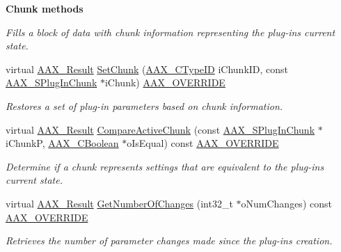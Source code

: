 \begin{Indent}{\bf Chunk methods}
\begin{DoxyCompactItemize}
\begin{DoxyCompactList}\small\item\em Fills a block of data with chunk information representing the plug-\/in\textquotesingle{}s current state. \end{DoxyCompactList}\item 
virtual \hyperlink{a00149_a4d8f69a697df7f70c3a8e9b8ee130d2f}{A\+A\+X\+\_\+\+Result} \hyperlink{a00018_af80a63ce88a2e95afb77aaca71dcb73f}{Set\+Chunk} (\hyperlink{a00149_ac678f9c1fbcc26315d209f71a147a175}{A\+A\+X\+\_\+\+C\+Type\+I\+D} i\+Chunk\+I\+D, const \hyperlink{a00125}{A\+A\+X\+\_\+\+S\+Plug\+In\+Chunk} $\ast$i\+Chunk) \hyperlink{a00149_ac2f24a5172689ae684344abdcce55463}{A\+A\+X\+\_\+\+O\+V\+E\+R\+R\+I\+D\+E}
\begin{DoxyCompactList}\small\item\em Restores a set of plug-\/in parameters based on chunk information. \end{DoxyCompactList}\item 
virtual \hyperlink{a00149_a4d8f69a697df7f70c3a8e9b8ee130d2f}{A\+A\+X\+\_\+\+Result} \hyperlink{a00018_af9d1e4ffec9dabf9fe8e71f89d3d18b2}{Compare\+Active\+Chunk} (const \hyperlink{a00125}{A\+A\+X\+\_\+\+S\+Plug\+In\+Chunk} $\ast$i\+Chunk\+P, \hyperlink{a00149_aa216506530f1d19a2965931ced2b274b}{A\+A\+X\+\_\+\+C\+Boolean} $\ast$o\+Is\+Equal) const \hyperlink{a00149_ac2f24a5172689ae684344abdcce55463}{A\+A\+X\+\_\+\+O\+V\+E\+R\+R\+I\+D\+E}
\begin{DoxyCompactList}\small\item\em Determine if a chunk represents settings that are equivalent to the plug-\/in\textquotesingle{}s current state. \end{DoxyCompactList}\item 
virtual \hyperlink{a00149_a4d8f69a697df7f70c3a8e9b8ee130d2f}{A\+A\+X\+\_\+\+Result} \hyperlink{a00018_a01b7a09da773ca60d2cd02bc9fa14f95}{Get\+Number\+Of\+Changes} (int32\+\_\+t $\ast$o\+Num\+Changes) const \hyperlink{a00149_ac2f24a5172689ae684344abdcce55463}{A\+A\+X\+\_\+\+O\+V\+E\+R\+R\+I\+D\+E}
\begin{DoxyCompactList}\small\item\em Retrieves the number of parameter changes made since the plug-\/in\textquotesingle{}s creation. \end{DoxyCompactList}\end{DoxyCompactItemize}
\end{Indent}
